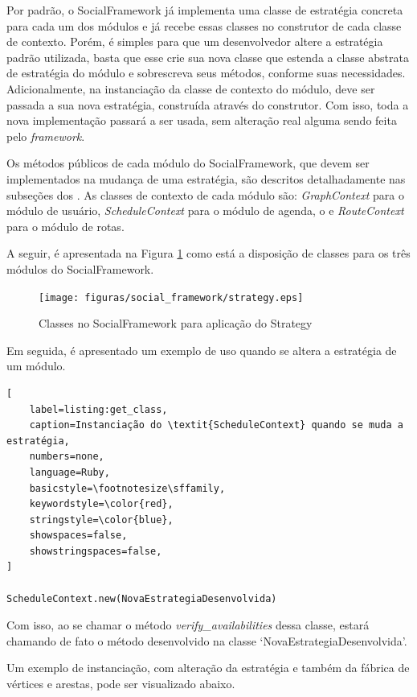 Por padrão, o SocialFramework já implementa uma classe de estratégia concreta para cada um dos módulos e já recebe essas classes no construtor de cada classe de contexto. Porém, é simples para que um desenvolvedor altere a estratégia padrão utilizada, basta que esse crie sua nova classe que estenda a classe abstrata de estratégia do módulo e sobrescreva seus métodos, conforme suas necessidades. Adicionalmente, na instanciação da classe de contexto do módulo, deve ser passada a sua nova estratégia, construída através do construtor. Com isso, toda a nova implementação passará a ser usada, sem alteração real alguma sendo feita pelo \textit{framework}.

Os métodos públicos de cada módulo do SocialFramework, que devem ser implementados na mudança de uma estratégia, são descritos detalhadamente nas subseções dos . As classes de contexto de cada módulo são: \textit{GraphContext} para o módulo de usuário, \textit{ScheduleContext} para o módulo de agenda, o e \textit{RouteContext} para o módulo de rotas.

A seguir, é apresentada na Figura \ref{padrao_strategy} como está a disposição de classes para os três módulos do SocialFramework.

\begin{figure}[h]
    \centering
    \texttt{[image: figuras/social\_framework/strategy.eps]}
    \caption{Classes no SocialFramework para aplicação do Strategy}
    \label{padrao_strategy}
\end{figure}

Em seguida, é apresentado um exemplo de uso quando se altera a estratégia de um módulo.

\begin{lstlisting}[
    label=listing:get_class,
    caption=Instanciação do \textit{ScheduleContext} quando se muda a estratégia,
    numbers=none,
    language=Ruby,
    basicstyle=\footnotesize\sffamily,
    keywordstyle=\color{red},
    stringstyle=\color{blue},
    showspaces=false,
    showstringspaces=false,
]

ScheduleContext.new(NovaEstrategiaDesenvolvida)
\end{lstlisting}

Com isso, ao se chamar o método \textit{verify\_availabilities} dessa classe, estará chamando de fato o método desenvolvido na classe `NovaEstrategiaDesenvolvida'.

Um exemplo de instanciação, com alteração da estratégia e também da fábrica de vértices e arestas, pode ser visualizado abaixo.

